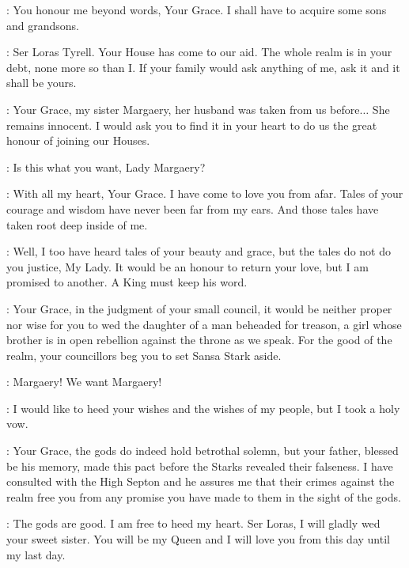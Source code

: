 \LITTLEFINGER: You honour me beyond words, Your Grace. I shall have to acquire some sons and grandsons. 


\JOFFREY: Ser Loras Tyrell. Your House has come to our aid. The whole realm is in your debt, none more so than I. If your family would ask anything of me, ask it and it shall be yours. 

\LORAS: Your Grace, my sister Margaery, her husband was taken from us before$\ldots$ She remains innocent. I would ask you to find it in your heart to do us the great honour of joining our Houses. 

\JOFFREY: Is this what you want, Lady Margaery?

\MARGAERY: With all my heart, Your Grace. I have come to love you from afar. Tales of your courage and wisdom have never been far from my ears. And those tales have taken root deep inside of me. 

\JOFFREY: Well, I too have heard tales of your beauty and grace, but the tales do not do you justice, My Lady. It would be an honour to return your love, but I am promised to another. A King must keep his word. 

\CERSEI: Your Grace, in the judgment of your small council, it would be neither proper nor wise for you to wed the daughter of a man beheaded for treason, a girl whose brother is in open rebellion against the throne as we speak. For the good of the realm, your councillors beg you to set Sansa Stark aside. 

\CROWD:  Margaery! We want Margaery! 

\JOFFREY: I would like to heed your wishes and the wishes of my people, but I took a holy vow. 

\PYCELLE: Your Grace, the gods do indeed hold betrothal solemn, but your father, blessed be his memory, made this pact before the Starks revealed their falseness. I have consulted with the High Septon and he assures me that their crimes against the realm free you from any promise you have made to them in the sight of the gods. 

\JOFFREY:  The gods are good. I am free to heed my heart. Ser Loras, I will gladly wed your sweet sister.  You will be my Queen and I will love you from this day until my last day. 


